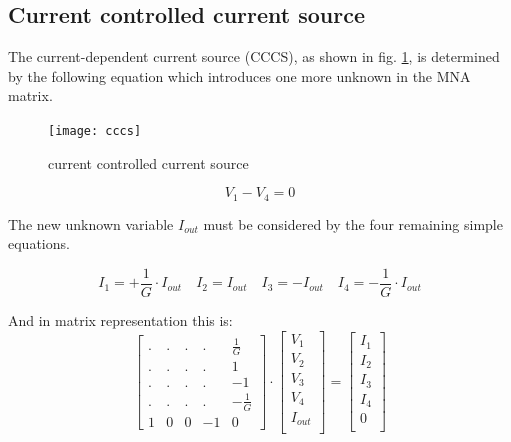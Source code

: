 \documentclass[10pt]{report}
\begin{document}
\subsection{Current controlled current source}

The current-dependent current source (CCCS), as shown in fig.
\ref{fig:cccs}, is determined by the following equation which
introduces one more unknown in the MNA matrix.

\begin{figure}[ht]
\begin{center}
\texttt{[image: cccs]}
\end{center}
\caption{current controlled current source}
\label{fig:cccs}
\end{figure}
\FloatBarrier

\begin{equation}
V_{1} - V_{4} = 0
\label{eq:cccs}
\end{equation}

The new unknown variable $I_{out}$ must be considered by the four
remaining simple equations.

\begin{equation}
I_{1} = +\frac{1}{G}\cdot I_{out} \quad I_{2} = I_{out} \quad I_{3} = -I_{out} \quad I_{4} = -\frac{1}{G}\cdot I_{out}
\end{equation}

And in matrix representation this is:
\begin{equation}
\begin{bmatrix}
.&.&.&.& \frac{1}{G}\\
.&.&.&.& 1\\
.&.&.&.& -1\\
.&.&.&.& -\frac{1}{G}\\
1 & 0 & 0 & -1 & 0
\end{bmatrix}
\cdot
\begin{bmatrix}
V_{1}\\
V_{2}\\
V_{3}\\
V_{4}\\
I_{out}\\
\end{bmatrix}
=
\begin{bmatrix}
I_{1}\\
I_{2}\\
I_{3}\\
I_{4}\\
0\\
\end{bmatrix}
\end{equation}
\end{document}
